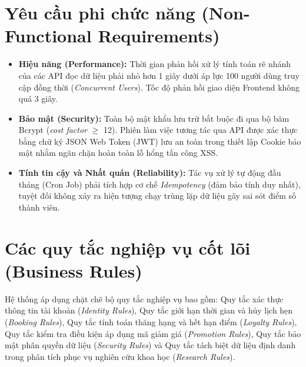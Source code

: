 \section{Yêu cầu phi chức năng (Non-Functional Requirements)}
\begin{itemize}
    \item \textbf{Hiệu năng (Performance):} Thời gian phản hồi xử lý tính toán rẽ nhánh của các API đọc dữ liệu phải nhỏ hơn 1 giây dưới áp lực 100 người dùng truy cập đồng thời (\textit{Concurrent Users}). Tốc độ phản hồi giao diện Frontend không quá 3 giây.
    \item \textbf{Bảo mật (Security):} Toàn bộ mật khẩu lưu trữ bắt buộc đi qua bộ băm Bcrypt (\textit{cost factor} \(\geq\) 12). Phiên làm việc tương tác qua API được xác thực bằng chữ ký JSON Web Token (JWT) lưu an toàn trong thiết lập Cookie bảo mật nhằm ngăn chặn hoàn toàn lỗ hổng tấn công XSS.
    \item \textbf{Tính tin cậy và Nhất quán (Reliability):} Tác vụ xử lý tự động đầu tháng (Cron Job) phải tích hợp cơ chế \textit{Idempotency} (đảm bảo tính duy nhất), tuyệt đối không xảy ra hiện tượng chạy trùng lặp dữ liệu gây sai sót điểm số thành viên.
\end{itemize}

\section{Các quy tắc nghiệp vụ cốt lõi (Business Rules)}
Hệ thống áp dụng chặt chẽ bộ quy tắc nghiệp vụ bao gồm: Quy tắc xác thực thông tin tài khoản (\textit{Identity Rules}), Quy tắc giới hạn thời gian và hủy lịch hẹn (\textit{Booking Rules}), Quy tắc tính toán thăng hạng và hết hạn điểm (\textit{Loyalty Rules}), Quy tắc kiểm tra điều kiện áp dụng mã giảm giá (\textit{Promotion Rules}), Quy tắc bảo mật phân quyền dữ liệu (\textit{Security Rules}) và Quy tắc tách biệt dữ liệu định danh trong phân tích phục vụ nghiên cứu khoa học (\textit{Research Rules}).